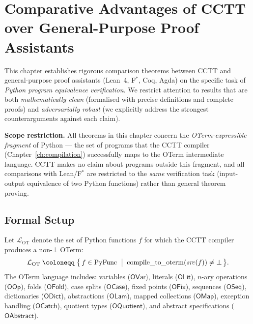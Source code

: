 
\chapter{Comparative Advantages of CCTT over General-Purpose Proof Assistants}
\label{ch:advantages}

This chapter establishes rigorous comparison theorems between CCTT and
general-purpose proof assistants (Lean~4, F${}^*$, Coq, Agda) on the
specific task of \emph{Python program equivalence verification}.  We
restrict attention to results that are both \emph{mathematically clean}
(formalised with precise definitions and complete proofs) and
\emph{adversarially robust} (we explicitly address the strongest
counter\-arguments against each claim).

\medskip
\textbf{Scope restriction.}  All theorems in this chapter concern the
\emph{OTerm-expressible fragment} of Python — the set of programs that
the CCTT compiler (Chapter~\ref{ch:compilation}) successfully maps to
the OTerm intermediate language.  CCTT makes no claim about programs
outside this fragment, and all comparisons with Lean/F${}^*$ are
restricted to the \emph{same} verification task (input-output
equivalence of two Python functions) rather than general theorem
proving.

\section{Formal Setup}
\label{sec:adv-setup}

\begin{definition}
\label{def:oterm-fragment}
Let $\mathcal{L}_{\mathrm{OT}}$ denote the set of Python functions
$f$ for which the CCTT compiler produces a non-$\bot$ OTerm:
\[
  \mathcal{L}_{\mathrm{OT}}
  \;\coloneqq\;
  \bigl\{\, f \in \mathrm{PyFunc}
  \;\bigm|\;
  \mathrm{compile\_to\_oterm}(\mathit{src}(f)) \neq \bot
  \,\bigr\}.
\]
The OTerm language includes: variables ($\mathsf{OVar}$), literals
($\mathsf{OLit}$), $n$-ary operations ($\mathsf{OOp}$), folds
($\mathsf{OFold}$), case splits ($\mathsf{OCase}$), fixed points
($\mathsf{OFix}$), sequences ($\mathsf{OSeq}$), dictionaries
($\mathsf{ODict}$), abstractions ($\mathsf{OLam}$), mapped
collections ($\mathsf{OMap}$), exception handling ($\mathsf{OCatch}$),
quotient types ($\mathsf{OQuotient}$), and abstract specifications
($\mathsf{OAbstract}$).
\end{definition}

